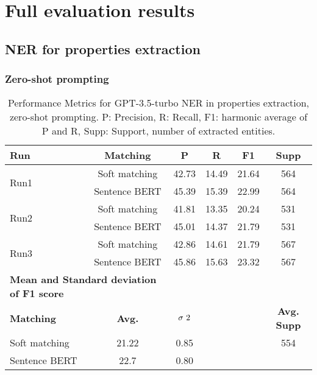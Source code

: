 
\section{Full evaluation results}
\label{appendix:full-evaluation-results}

\subsection{NER for properties extraction}

\subsubsection{Zero-shot prompting}
\begin{table}[htbp]
\small
  \centering
  \caption{Performance Metrics for GPT-3.5-turbo NER in properties extraction, zero-shot prompting. P: Precision, R: Recall, F1: harmonic average of P and R, Supp: Support, number of extracted entities.}
  \begin{tabular}{lccccc}
    \toprule
    \textbf{Run} & \textbf{Matching} & \textbf{P} & \textbf{R} & \textbf{F1} & \textbf{Supp} \\
    \midrule
    \multirow{2}{*}{Run1} & Soft matching & 42.73 & 14.49 & 21.64 & 564 \\
    & Sentence BERT & 45.39 & 15.39 & 22.99 & 564 \\
    \midrule
    \multirow{2}{*}{Run2} & Soft matching & 41.81 & 13.35 & 20.24 & 531 \\
    & Sentence BERT & 45.01 & 14.37 & 21.79 & 531 \\
    \midrule
    \multirow{2}{*}{Run3} & Soft matching & 42.86 & 14.61 & 21.79 & 567 \\
    & Sentence BERT & 45.86 & 15.63 & 23.32 & 567 \\
    \midrule
    \multicolumn{2}{l}{\textbf{Mean and Standard deviation of F1 score}} & & & & \\
    \midrule
    \textbf{Matching} & \textbf{Avg.} & $\sigma\textsuperscript{2}$ & & & \textbf{Avg. Supp}\\
    Soft matching & 21.22 & 0.85 & & & 554 \\
    Sentence BERT & 22.7 & 0.80 & & & \\
    \bottomrule
  \end{tabular}
\end{table}


